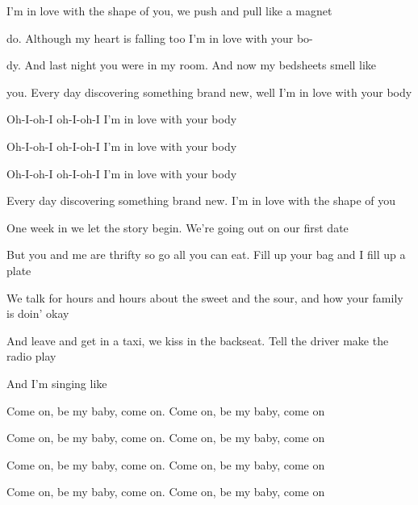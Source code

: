 \begin{song}
\begin{chorusbox}{\PrechorusAndChorus}
 I'm in love with the shape of you, we push and pull like a magnet \par
{}do. Although my heart is falling too I'm in love with your bo- \par
{}dy. And last night you were in my room. And now my bedsheets smell like \par
{}you. Every day discovering something brand new, well I'm in love with your body \par
{}Oh-I-oh-I oh-I-oh-I  I'm in love with your body \par
{}Oh-I-oh-I oh-I-oh-I  I'm in love with your body \par
{}Oh-I-oh-I oh-I-oh-I  I'm in love with your body \par
{} Every day discovering something brand new. I'm in love with the shape of you \par
\end{chorusbox}

\bigskip

One week in we let the story begin. We're going out on our first date \par
But you and me are thrifty so go all you can eat. Fill up your bag and I fill up a plate \par
We talk for hours and hours about the sweet and the sour, and how your family is doin' okay \par
And leave and get in a taxi, we kiss in the backseat. Tell the driver make the radio play \par
And I'm singing like \par

\bigskip

\PrechorusAndChorus

\bigskip

 \par
Come on, be my baby, come on. Come on, be my baby, come on \par
Come on, be my baby, come on. Come on, be my baby, come on \par
{} Come on, be my baby, come on.  Come on, be my baby, come on \par
{} Come on, be my baby, come on.  Come on, be my baby, come on \par


\end{song}
